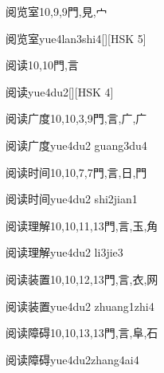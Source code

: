\begin{Entry}{阅览室}{10,9,9}{⾨,⾒,⼧}
  \begin{Phonetics}{阅览室}{yue4lan3shi4}[][HSK 5]
  \end{Phonetics}
\end{Entry}

\begin{Entry}{阅读}{10,10}{⾨,⾔}
  \begin{Phonetics}{阅读}{yue4du2}[][HSK 4]
  \end{Phonetics}
\end{Entry}

\begin{Entry}{阅读广度}{10,10,3,9}{⾨,⾔,⼴,⼴}
  \begin{Phonetics}{阅读广度}{yue4du2 guang3du4}
  \end{Phonetics}
\end{Entry}

\begin{Entry}{阅读时间}{10,10,7,7}{⾨,⾔,⽇,⾨}
  \begin{Phonetics}{阅读时间}{yue4du2 shi2jian1}
  \end{Phonetics}
\end{Entry}

\begin{Entry}{阅读理解}{10,10,11,13}{⾨,⾔,⽟,⾓}
  \begin{Phonetics}{阅读理解}{yue4du2 li3jie3}
  \end{Phonetics}
\end{Entry}

\begin{Entry}{阅读装置}{10,10,12,13}{⾨,⾔,⾐,⽹}
  \begin{Phonetics}{阅读装置}{yue4du2 zhuang1zhi4}
  \end{Phonetics}
\end{Entry}

\begin{Entry}{阅读障碍}{10,10,13,13}{⾨,⾔,⾩,⽯}
  \begin{Phonetics}{阅读障碍}{yue4du2zhang4ai4}
  \end{Phonetics}
\end{Entry}

